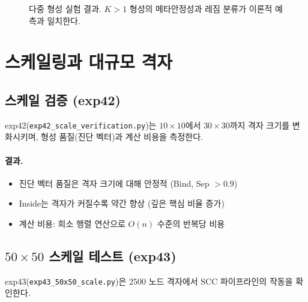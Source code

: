 \begin{figure}[t]
\centering
{}
\caption{다중 형성 실험 결과. $K > 1$ 형성의 메타안정성과 레짐 분류가 이론적 예측과 일치한다.}
\label{fig:multi-formation-exps}
\end{figure}


\section{스케일링과 대규모 격자}
\label{sec:exp-scaling}

\subsection{스케일 검증 (exp42)}

exp42(\texttt{exp42\_scale\_verification.py})는 $10 \times 10$에서 $30 \times 30$까지 격자 크기를 변화시키며, 형성 품질(진단 벡터)과 계산 비용을 측정한다.

\paragraph{결과.}
\begin{itemize}
    \item 진단 벡터 품질은 격자 크기에 대해 안정적 (Bind, Sep $> 0.9$)
    \item Inside는 격자가 커질수록 약간 향상 (깊은 핵심 비율 증가)
    \item 계산 비용: 희소 행렬 연산으로 $O(n)$ 수준의 반복당 비용
\end{itemize}

\subsection{$50 \times 50$ 스케일 테스트 (exp43)}

exp43(\texttt{exp43\_50x50\_scale.py})은 2500 노드 격자에서 SCC 파이프라인의 작동을 확인한다.

